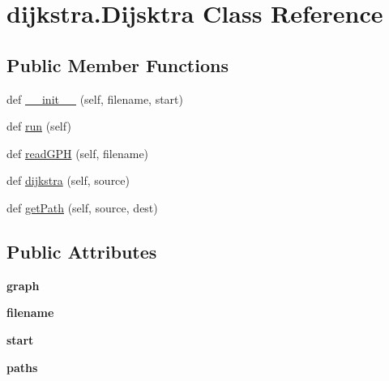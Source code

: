 \hypertarget{classdijkstra_1_1Dijsktra}{}\section{dijkstra.\+Dijsktra Class Reference}
\label{classdijkstra_1_1Dijsktra}
\subsection*{Public Member Functions}
\begin{DoxyCompactItemize}
\item 
def \hyperlink{classdijkstra_1_1Dijsktra_a07d851e3b6b71f4bb0bc37d7045fa1e9}{\+\_\+\+\_\+init\+\_\+\+\_\+} (self, filename, start)
\item 
def \hyperlink{classdijkstra_1_1Dijsktra_a291840e7c5018d10dc75cf4a2f322b4c}{run} (self)
\item 
def \hyperlink{classdijkstra_1_1Dijsktra_a8e0d20b4b73b58dc2198b425f0d71fc5}{read\+G\+PH} (self, filename)
\item 
def \hyperlink{classdijkstra_1_1Dijsktra_a851d3a005118bd06bbf7bebc15e2888f}{dijkstra} (self, source)
\item 
def \hyperlink{classdijkstra_1_1Dijsktra_a84fe73d0daafeb326e01196ab4ddf366}{get\+Path} (self, source, dest)
\end{DoxyCompactItemize}
\subsection*{Public Attributes}
\begin{DoxyCompactItemize}
\item 
{\bfseries graph}\hypertarget{classdijkstra_1_1Dijsktra_ad8ff1b636e8eb22edf2d009ddb45f925}{}\label{classdijkstra_1_1Dijsktra_ad8ff1b636e8eb22edf2d009ddb45f925}

\item 
{\bfseries filename}\hypertarget{classdijkstra_1_1Dijsktra_aed1c81c8ef8ea8b4ef1a8ee7379e4625}{}\label{classdijkstra_1_1Dijsktra_aed1c81c8ef8ea8b4ef1a8ee7379e4625}

\item 
{\bfseries start}\hypertarget{classdijkstra_1_1Dijsktra_a2c085616618ce62ff5635493437a1f42}{}\label{classdijkstra_1_1Dijsktra_a2c085616618ce62ff5635493437a1f42}

\item 
{\bfseries paths}\hypertarget{classdijkstra_1_1Dijsktra_ad69d7add778f77ed6d5ef2bbb92215e7}{}\label{classdijkstra_1_1Dijsktra_ad69d7add778f77ed6d5ef2bbb92215e7}

\end{DoxyCompactItemize}


